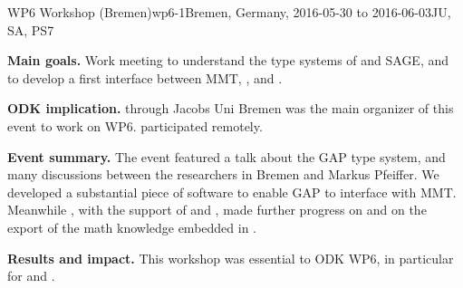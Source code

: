 \begin{event}{WP6 Workshop (Bremen)}{wp6-1}{Bremen, Germany, 2016-05-30 to 2016-06-03}{JU, SA, PS}{7}{}

\textbf{Main goals.} Work meeting to understand the type systems of \GAP and
SAGE, and to develop a first interface between MMT, \GAP, and \Sage.

\textbf{ODK implication.} \ODK through Jacobs Uni Bremen was the main
organizer of this event to work on WP6.  participated remotely.

\textbf{Event summary.} The event featured a talk about the GAP type
system, and many discussions between the researchers in Bremen and
Markus Pfeiffer. We developed a substantial piece of software to
enable GAP to interface with MMT. Meanwhile , with the
support of  and , made further progress on
 and on
the export of the math knowledge embedded in \Sage.

\textbf{Results and impact.}  This workshop was essential to ODK WP6,
in particular for  and
.

\end{event}

